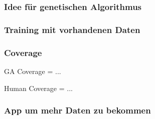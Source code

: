 \begin{frame}
    \frametitle{Idee für genetischen Algorithmus}
\end{frame}

\begin{frame}
    \frametitle{Training mit vorhandenen Daten}
\end{frame}


\begin{frame}
  \frametitle{Coverage}
  \begin{center}
  \huge{GA Coverage = ...}
  \end{center}
  \begin{center}
  \huge{Human Coverage = ... }
  \end{center}
\end{frame}

\begin{frame}
    \frametitle{App um mehr Daten zu bekommen}
\end{frame}
